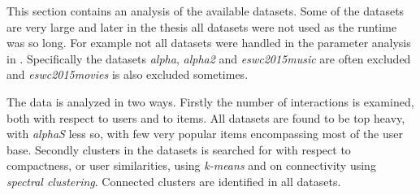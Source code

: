 
This section contains an analysis of the available datasets. Some of the datasets are very large and later in the thesis all datasets were not used as the runtime was so long. For example not all datasets were handled in the parameter analysis in . Specifically the datasets \textit{alpha}, \textit{alpha2} and \textit{eswc2015music} are often excluded and \textit{eswc2015movies} is also excluded sometimes.

The data is analyzed in two ways. Firstly the number of interactions is examined, both with respect to users and to items. All datasets are found to be top heavy, with \textit{alphaS} less so, with few very popular items encompassing most of the user base. Secondly clusters in the datasets is searched for with respect to compactness, or user similarities, using \textit{k-means} and on connectivity using \textit{spectral clustering}. Connected clusters are identified in all datasets.




